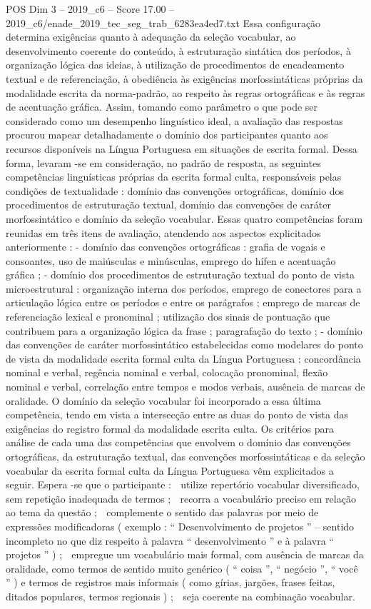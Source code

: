 \begin{textsample}{POS Dim 3 – 2019\_c6 – Score 17.00 – 2019\_c6/enade\_2019\_tec\_seg\_trab\_6283ea4ed7.txt}
Essa configuração determina exigências quanto à adequação da seleção vocabular, ao desenvolvimento coerente do conteúdo, à estruturação sintática dos períodos, à organização lógica das ideias, à utilização de procedimentos de encadeamento textual e de referenciação, à obediência às exigências morfossintáticas próprias da modalidade escrita da norma-padrão, ao respeito às regras ortográficas e às regras de acentuação gráfica.
Assim, tomando como parâmetro o que pode ser considerado como um desempenho linguístico ideal, a avaliação das respostas procurou mapear detalhadamente o domínio dos participantes quanto aos recursos disponíveis na Língua Portuguesa em situações de escrita formal.
Dessa forma, levaram -se em consideração, no padrão de resposta, as seguintes competências linguísticas próprias da escrita formal culta, responsáveis pelas condições de textualidade : domínio das convenções ortográficas, domínio dos procedimentos de estruturação textual, domínio das convenções de caráter morfossintático e domínio da seleção vocabular.
Essas quatro competências foram reunidas em três itens de avaliação, atendendo aos aspectos explicitados anteriormente : - domínio das convenções ortográficas : grafia de vogais e consoantes, uso de maiúsculas e minúsculas, emprego do hífen e acentuação gráfica ; - domínio dos procedimentos de estruturação textual do ponto de vista microestrutural : organização interna dos períodos, emprego de conectores para a articulação lógica entre os períodos e entre os parágrafos ; emprego de marcas de referenciação lexical e pronominal ; utilização dos sinais de pontuação que contribuem para a organização lógica da frase ; paragrafação do texto ; - domínio das convenções de caráter morfossintático estabelecidas como modelares do ponto de vista da modalidade escrita formal culta da Língua Portuguesa : concordância nominal e verbal, regência nominal e verbal, colocação pronominal, flexão nominal e verbal, correlação entre tempos e modos verbais, ausência de marcas de oralidade.
O domínio da seleção vocabular foi incorporado a essa última competência, tendo em vista a intersecção entre as duas do ponto de vista das exigências do registro formal da modalidade escrita culta.
Os critérios para análise de cada uma das competências que envolvem o domínio das convenções ortográficas, da estruturação textual, das convenções morfossintáticas e da seleção vocabular da escrita formal culta da Língua Portuguesa vêm explicitados a seguir.
Espera -se que o participante :  utilize repertório vocabular diversificado, sem repetição inadequada de termos ;  recorra a vocabulário preciso em relação ao tema da questão ;  complemente o sentido das palavras por meio de expressões modificadoras ( exemplo : “ Desenvolvimento de projetos ” – sentido incompleto no que diz respeito à palavra “ desenvolvimento ” e à palavra “ projetos ” ) ;  empregue um vocabulário mais formal, com ausência de marcas da oralidade, como termos de sentido muito genérico ( “ coisa ”, “ negócio ”, “ você ” ) e termos de registros mais informais ( como gírias, jargões, frases feitas, ditados populares, termos regionais ) ;  seja coerente na combinação vocabular.

\end{textsample}
